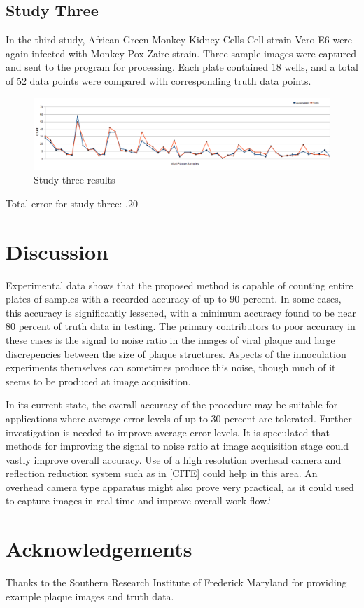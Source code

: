 \documentclass[11pt,final,twocolumn]{IEEEtran}
\begin{document}
\subsection{Study Three}
In the third study, African Green Monkey Kidney Cells  Cell strain Vero E6 were again infected with Monkey Pox Zaire strain. Three sample images were captured and sent to the program for processing. Each plate contained 18 wells, and a total of 52 data points were compared with corresponding truth data points.
\begin{figure}[H]
\centering
\includegraphics[width=.4\textwidth]{Study3Results.png}
\caption{Study three results}
\label{fig:study3Results}
\end{figure}
Total error for study three: $.20$ 


\section{Discussion}
Experimental data shows that the proposed method is capable of counting entire plates of samples with a recorded accuracy of up to 90 percent.  In some cases, this accuracy is significantly lessened, with a minimum accuracy found to be near 80 percent of truth data in testing. The primary contributors to poor accuracy in these cases is the signal to noise ratio in the images of viral plaque and large discrepencies between the size of plaque structures. Aspects of the innoculation experiments themselves can sometimes produce this noise, though much of it seems to be produced at image acquisition. 

In its current state, the overall accuracy of the procedure may be suitable for applications where average error levels of up to 30 percent are tolerated.     Further investigation is needed to improve average error levels. It is speculated that methods for improving the signal to noise ratio at image acquisition stage could vastly improve overall accuracy. Use of a high resolution overhead camera and reflection reduction system such as in [CITE] could help in this area. An overhead camera type apparatus might also prove very practical, as it could used to capture images in real time and improve overall work flow.`

 
\appendix

\section{Acknowledgements}
Thanks to the Southern Research Institute of Frederick Maryland for providing example plaque images and truth data.
\end{document}
